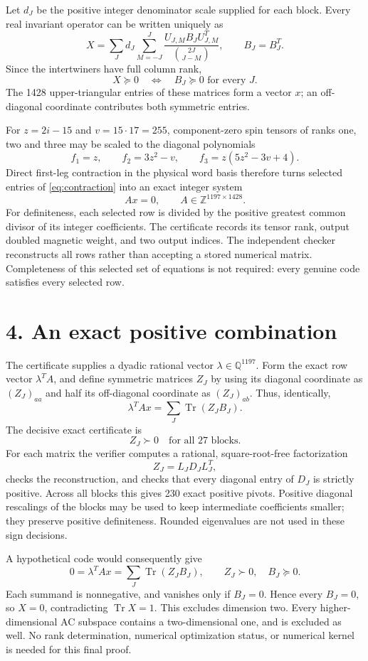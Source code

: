 \documentclass[11pt]{article}
\newcommand{\Tr}{\operatorname{Tr}}
\begin{document}
Let $d_J$ be the positive integer denominator scale supplied for each block. Every real invariant operator can be written uniquely as
\[
 X=\sum_J d_J\sum_{M=-J}^{J}
 \frac{U_{J,M}B_JU_{J,M}^{T}}{\binom{2J}{J-M}},
 \qquad B_J=B_J^T.
\]
Since the intertwiners have full column rank,
\[
 X\succeq0\quad\Longleftrightarrow\quad B_J\succeq0\text{ for every }J.
\]
The 1428 upper-triangular entries of these matrices form a vector $x$; an off-diagonal coordinate contributes both symmetric entries.

For $z=2i-15$ and $v=15\cdot17=255$, component-zero spin tensors of ranks one, two and three may be scaled to the diagonal polynomials
\[
 f_1=z,\qquad f_2=3z^2-v,\qquad
 f_3=z(5z^2-3v+4).
\]
Direct first-leg contraction in the physical word basis therefore turns selected entries of \eqref{eq:contraction} into an exact integer system
\[
 Ax=0,\qquad A\in\mathbb Z^{1197\times1428}.
\]
For definiteness, each selected row is divided by the positive greatest common divisor of its integer coefficients. The certificate records its tensor rank, output doubled magnetic weight, and two output indices. The independent checker reconstructs all rows rather than accepting a stored numerical matrix. Completeness of this selected set of equations is not required: every genuine code satisfies every selected row.

\section*{4. An exact positive combination}
The certificate supplies a dyadic rational vector $\lambda\in\mathbb Q^{1197}$.
Form the exact row vector $\lambda^TA$, and define symmetric matrices $Z_J$ by using its diagonal coordinate as $(Z_J)_{aa}$ and half its off-diagonal coordinate as $(Z_J)_{ab}$. Thus, identically,
\[
 \lambda^TAx=\sum_J\Tr(Z_JB_J).
\]
The decisive exact certificate is
\[
 \boxed{Z_J\succ0\quad\text{for all 27 blocks}.}
\]
For each matrix the verifier computes a rational, square-root-free factorization
\[
 Z_J=L_JD_JL_J^T,
\]
checks the reconstruction, and checks that every diagonal entry of $D_J$ is strictly positive. Across all blocks this gives 230 exact positive pivots. Positive diagonal rescalings of the blocks may be used to keep intermediate coefficients smaller; they preserve positive definiteness. Rounded eigenvalues are not used in these sign decisions.

A hypothetical code would consequently give
\[
 0=\lambda^TAx=\sum_J\Tr(Z_JB_J),
 \qquad Z_J\succ0,\quad B_J\succeq0.
\]
Each summand is nonnegative, and vanishes only if $B_J=0$. Hence every $B_J=0$, so $X=0$, contradicting $\Tr X=1$.
This excludes dimension two. Every higher-dimensional AC subspace contains a two-dimensional one, and is excluded as well. No rank determination, numerical optimization status, or numerical kernel is needed for this final proof.
\end{document}
